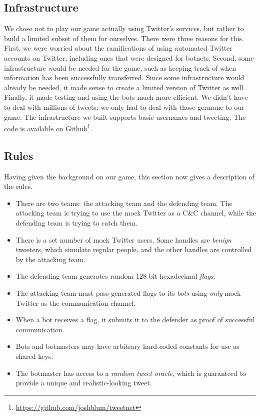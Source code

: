 \documentclass[11pt, oneside]{article} %
\numberwithin{equation}{section} %
\numberwithin{figure}{section} %
\numberwithin{table}{section} %
\begin{document}
	\subsection{Infrastructure}
		We chose not to play our game actually using Twitter's services, but rather to build a limited subset of them for ourselves. There were three reasons for this. First, we were worried about the ramifications of using automated Twitter accounts on Twitter, including ones that were designed for botnets. Second, some infrastructure would be needed for the game, such as keeping track of when information has been successfully transferred. Since some infrastructure would already be needed, it made sense to create a limited version of Twitter as well. Finally, it made testing and using the bots much more efficient. We didn't have to deal with millions of tweets; we only had to deal with those germane to our game. The infrastructure we built supports basic usernames and tweeting. The code is available on Github\footnote{\url{https://github.com/joshblum/tweetnet}}.

	\subsection{Rules}
		Having given the background on our game, this section now gives a description of the rules.
        
		\begin{itemize}
		 
         \item There are two teams: the attacking team and the defending team. The attacking team is trying to use the mock Twitter as a C\&C channel, while the defending team is trying to catch them.
		 
         \item There is a set number of mock Twitter users. Some handles are \textit{benign} tweeters, which simulate regular people, and the other handles are controlled by the attacking team.
		
         \item The defending team generates random 128 bit hexadecimal \textit{flags}.
		 
         \item The attacking team must pass generated flags to its \textit{bots} using \emph{only} mock Twitter as the communication channel.
		
        \item When a bot receives a flag, it submits it to the defender as proof of successful communication.
        
        \item Bots and botmasters may have arbitrary hard-coded constants for use as shared keys.
        
        \item The botmaster has access to a \textit{random tweet oracle}, which is guaranteed to provide a unique and realistic-looking tweet.
		\end{itemize}
\end{document}
